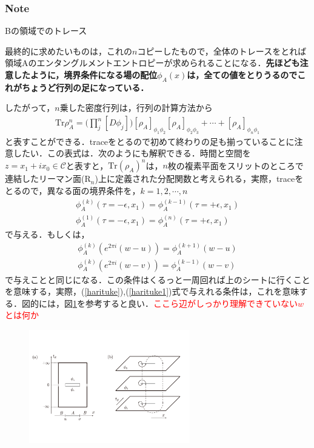\subsubsection{Note}

\hrulefill

Bの領域でのトレース

\hrulefill
最終的に求めたいものは，これの$n$コピーしたもので，全体のトレースをとれば領域Aのエンタングルメントエントロピーが求められることになる．\textbf{先ほども注意したように，境界条件になる場の配位$\phi_{A}(x)$は，全ての値をとりうるのでこれがちょうど行列の足になっている．}

したがって，$n$乗した密度行列は，行列の計算方法から
\begin{align}
  \mathrm{Tr}\rho_{A}^{n}=\biggl(\prod^{n}_{j}[D\phi_{j}]\biggr)[\rho_{A}]_{\phi_1\phi_2}[\rho_{A}]_{\phi_2\phi_3}+\cdots+[\rho_{A}]_{\phi_n\phi_1}
\end{align}
と表すことができる．traceをとるので初めて終わりの足も揃っていることに注意したい．この表式は．次のようにも解釈できる．時間と空間を$z=x_1+ix_0 \in \mathcal{C}$と表すと，$\mathrm{Tr}(\rho_A)^n$は，$n$枚の複素平面をスリットのところで連結したリーマン面($\mathrm{R}_n$)上に定義された分配関数と考えられる，実際，traceをとるので，異なる面の境界条件を，$k=1,2,\cdots,n$
\begin{align}
  \label{harituke}
  \phi_{A}^{(k)}(\tau=-\epsilon,x_1)=\phi_{A}^{(k-1)}(\tau=+\epsilon,x_1)\\
  \label{harituke1}
  \phi_{A}^{(1)}(\tau=-\epsilon,x_1)=\phi_{A}^{(n)}(\tau=+\epsilon,x_1)
\end{align}
で与える．もしくは，
\begin{align}
  \phi_{A}^{(k)}(e^{2\pi i}(w-u))=\phi_{A}^{(k+1)}(w-u)\\
  \phi_{A}^{(k)}(e^{2\pi i}(w-v))=\phi_{A}^{(k-1)}(w-v)
\end{align}
で与えことと同じになる．この条件はくるっと一周回れば上のシートに行くことを意味する，実際，(\ref{harituke}),(\ref{harituke1})式で与えれる条件は，これを意味する．図的には，図\ref{replica00}を参考すると良い．\textcolor{red}{ここら辺がしっかり理解できていない$w$とは何か}
\begin{figure}[H]
\begin{center}
  \includegraphics[width=7cm,angle=270]{replica.pdf}
  　　　\caption{}
  　　\label{replica00}
\end{center}
\end{figure}

